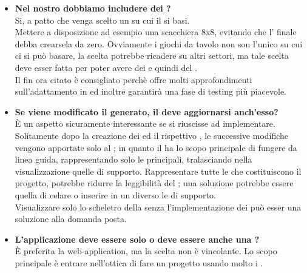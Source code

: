 \begin{itemize}
\newpage			  	
	      \item
	      \textbf{Nel nostro  dobbiamo includere dei ?\\}
		\justifying
		Si, a patto che venga scelto un  su cui il  si basi.\\
		Mettere a disposizione ad esempio una scacchiera 8x8, evitando che l' finale debba crearsela da zero.
		Ovviamente i giochi da tavolo non son l'unico  su cui ci si può basare, la scelta potrebbe ricadere su altri settori, ma tale scelta deve esser fatta per poter avere dei  e quindi del .\\
	Il  fin ora citato è consigliato perchè offre molti approfondimenti sull'adattamento in  ed inoltre garantirà una fase di testing più piacevole. \\
	
	    \item
	    \textbf{Se viene modificato il  generato, il  deve aggiornarsi anch'esso?\\}
	    \justifying
	   È un aspetto sicuramente interessante se si riuscisse ad implementare. Solitamente dopo la creazione dei  ed il rispettivo , le successive modifiche vengono apportate solo al ; in quanto il  ha lo scopo principale di fungere da linea guida, rappresentando solo le  principali, tralasciando nella visualizzazione quelle di supporto. Rappresentare tutte le  che costituiscono il progetto, potrebbe ridurre la leggibilità del ; una soluzione potrebbe essere quella di celare o inserire in un  diverso le  di supporto.\\
     Visualizzare solo lo scheletro della  senza l'implementazione dei  può esser una soluzione alla domanda posta.\\
	     
	   	 \item
	   	 \textbf{L'applicazione deve essere solo  o deve essere anche una ?\\}
	   	 \justifying
	   	 È preferita la web-application, ma la scelta non è vincolante. Lo scopo principale è entrare nell'ottica di fare un progetto usando molto i .\\
			 	

\end{itemize}
